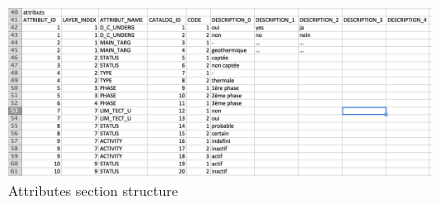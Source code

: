 \documentclass[a4paper, 12pt]{article}
\begin{document}
\begin{figure} [htbp]
	\centering
    \includegraphics[width=.9\textwidth]{img/attributs.png}
    \caption{Attributes section structure}
    \label{fig:attributs}
\end{figure}
\end{document}
